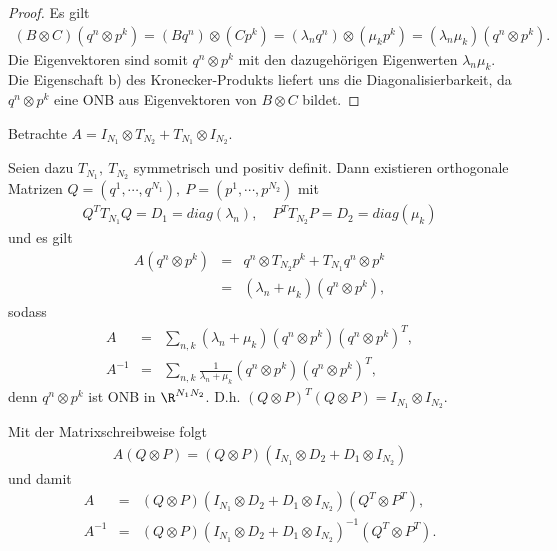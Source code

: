 \begin{proof}
    Es gilt
    \begin{eqnarray*}
          (B \otimes C) (q^n \otimes p^k)
        = (B q^n) \otimes (C p^k)
        = (\lambda_n q^n) \otimes (\mu_k p^k)
        = (\lambda_n \mu_k) (q^n \otimes p^k).
    \end{eqnarray*}
    Die Eigenvektoren sind somit $q^n \otimes p^k$ mit den dazugehörigen
    Eigenwerten $\lambda_n \mu_k$. Die Eigenschaft b) des Kronecker-Produkts
    liefert uns die Diagonalisierbarkeit, da $q^n \otimes p^k$
    eine ONB aus Eigenvektoren von $B \otimes C$ bildet.
\end{proof}


\begin{Anwendung}
    Betrachte $A = I_{N_1} \otimes T_{N_2} + T_{N_1} \otimes I_{N_2}$.

    Seien dazu $T_{N_1}, \ T_{N_2}$ symmetrisch und positiv definit. Dann
    existieren orthogonale Matrizen $Q = (q^1, \cdots, q^{N_1}), \
    P = (p^1, \cdots, p^{N_2})$ mit
    \begin{eqnarray*}
        Q^T T_{N_1} Q = D_1 = diag(\lambda_n), \quad
        P^T T_{N_2} P = D_2 = diag(\mu_k)
    \end{eqnarray*}
    und es gilt
    \begin{eqnarray*}
            A (q^n \otimes p^k)
        &=& q^n \otimes T_{N_2} p^k + T_{N_1} q^n \otimes p^k \\
        &=& (\lambda_n + \mu_k) (q^n \otimes p^k),
    \end{eqnarray*}
    sodass
    \begin{eqnarray*}
            A
        &=& \sum_{n, k} (\lambda_n + \mu_k) (q^n \otimes p^k)
            (q^n \otimes p^k)^T, \\
            A^{-1}
        &=& \sum_{n, k} \frac{1}{\lambda_n + \mu_k} (q^n \otimes p^k)
            (q^n \otimes p^k)^T,
    \end{eqnarray*}
    denn $q^n \otimes p^k$ ist ONB in $\R^{N_1 N_2}$. D.h. $(Q \otimes P)^T
    (Q \otimes P) = I_{N_1} \otimes I_{N_2}$.

    Mit der Matrixschreibweise folgt
    \begin{eqnarray*}
        A(Q \otimes P) = (Q \otimes P)
                         (I_{N_1} \otimes D_2 + D_1 \otimes I_{N_2})
    \end{eqnarray*}
    und damit
    \begin{eqnarray*}
            A
        &=& (Q \otimes P)
            (I_{N_1} \otimes D_2 + D_1 \otimes I_{N_2})
            (Q^T \otimes P^T), \\
            A^{-1}
        &=& (Q \otimes P)
            (I_{N_1} \otimes D_2 + D_1 \otimes I_{N_2})^{-1}
            (Q^T \otimes P^T).
    \end{eqnarray*}
\end{Anwendung}


